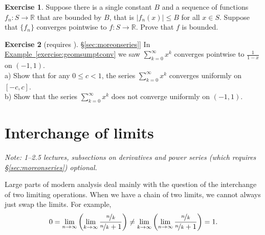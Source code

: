 \documentclass[12pt]{book}
\newcommand{\abs}[1]{\left\lvert {#1} \right\rvert}
\newcommand{\R}{{\mathbb{R}}}
\newcommand{\sectionnotes}[1]{\noindent \emph{Note: #1} \medskip \par}
\newcommand{\sectionnewpage}{\clearpage}
\theoremstyle{plain}
\theoremstyle{remark}
\theoremstyle{definition}
\newenvironment{exnote}{\small}{}
\theoremstyle{exercise}
\newtheorem{exercise}{Exercise}[section]
\theoremstyle{example}
\newcommand{\sectionref}[1]{\hyperref[#1]{\S\ref*{#1}}}
\newcommand{\exampleref}[1]{\hyperref[#1]{Example~\ref*{#1}}}
\begin{document}
\begin{exercise}
Suppose there is a single constant $B$ and
a sequence of functions
$f_n \colon S \to \R$ that are bounded by $B$,
that is $\abs{f_n(x)} \leq B$ for all $x \in S$.
Suppose that $\{ f_n \}$ converges pointwise
to $f \colon S \to \R$.
Prove that $f$ is bounded.
\end{exercise}

\begin{exercise}[requires \sectionref{sec:moreonseries}]
In \exampleref{exercise:geomsumptconv} we saw
$\sum_{k=0}^\infty x^k$ converges pointwise to $\frac{1}{1-x}$ on
$(-1,1)$.\\
a) Show that for any $0 \leq c < 1$, the series
$\sum_{k=0}^\infty x^k$ converges uniformly on $[-c,c]$.
\\
b) Show that the series $\sum_{k=0}^\infty x^k$ does not converge uniformly
on $(-1,1)$.
\end{exercise}




\sectionnewpage
\section{Interchange of limits}
\label{sec:liminter}

\sectionnotes{1--2.5 lectures,
subsections on derivatives and power series (which
requires \sectionref{sec:moreonseries}) optional.}

Large parts of modern analysis deal mainly with the question of the
interchange of two limiting operations.  When
we have a chain of two limits, we cannot always just swap the limits.
For example,
\begin{equation*}
0 = 
\lim_{n\to\infty}
\left(
\lim_{k\to\infty}
\frac{\nicefrac{n}{k}}{\nicefrac{n}{k} + 1}
\right)
\not=
\lim_{k\to\infty}
\left(
\lim_{n\to\infty}
\frac{\nicefrac{n}{k}}{\nicefrac{n}{k} + 1}
\right)
= 1 .
\end{equation*}
\end{document}
